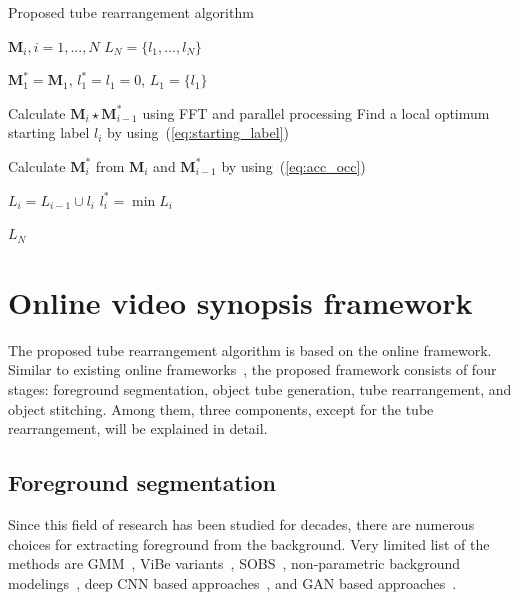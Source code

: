 \documentclass[11pt]{hyu_thesis}
\begin{document}
\begin{algorithm}[t]
	\caption{Proposed tube rearrangement algorithm}
	\label{alg:proposed}
	\begin{algorithmic}
		\REQUIRE $\textbf{M}_{i}, i = 1,...,N$
		\ENSURE $L_{N} = \{ l_{1},...,l_{N} \}$
		
		\STATE $\textbf{M}_{1}^{*} = \textbf{M}_{1}$, $l_{1}^{*} = l_{1} = 0$, $L_{1} = \{ l_{1} \}$
		
		\STATE Calculate $\textbf{M}_{i} \star \textbf{M}_{i-1}^{*}$ using FFT and parallel processing
		\STATE Find a local optimum starting label $l_{i}$ by using~(\ref{eq:starting_label})

		\STATE Calculate $\textbf{M}_{i}^{*}$ from $\textbf{M}_{i}$ and $\textbf{M}_{i-1}^{*}$ by using~(\ref{eq:acc_occ})

		\STATE $L_{i} = L_{i-1} \cup l_{i}$
		\STATE $l_{i}^{*} = \min L_{i}$
		\ENDFOR
		
		\RETURN $L_{N}$
	\end{algorithmic}
\end{algorithm}
\chapter{Online video synopsis framework}
\label{sec:framework}
The proposed tube rearrangement algorithm is based on the online framework. Similar to existing online frameworks~\cite{Fu2014,Zhu2015,He2017}, the proposed framework consists of four stages: foreground segmentation, object tube generation, tube rearrangement, and object stitching. Among them, three components, except for the tube rearrangement, will be explained in detail.

\section{Foreground segmentation}
Since this field of research has been studied for decades, there are numerous choices for extracting foreground from the background. Very limited list of the methods are GMM~\cite{Stauffer1999,Zivkovic2004,Zivkovic2006}, ViBe variants~\cite{Barnich2009ViBe,Barnich2011ViBe,VanDroogenbroeck2012Background,VanDroogenbroeck2014ViBe}, SOBS~\cite{maddalena2008self,maddalena2012sobs}, non-parametric background modelings~\cite{Hofmann2012,Muchtar2018}, deep CNN based approaches~\cite{Patil2018,Lim2018}, and GAN based approaches~\cite{Bakkay2018,Sultana2019,Sakkos2019}.
\end{document}
